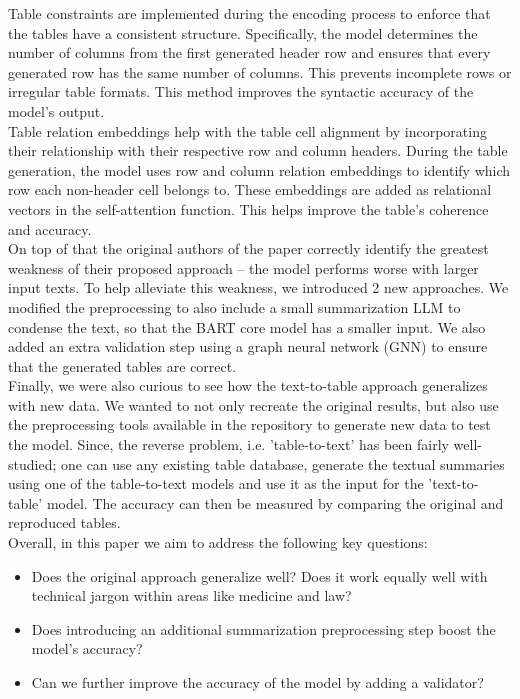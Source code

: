 \documentclass[12pt,a4paper]{article}
\begin{document}
Table constraints are implemented during the encoding process to enforce that the tables have a consistent structure. Specifically, the model determines the number of columns from the first generated header row and ensures that every generated row has the same number of columns. This prevents incomplete rows or irregular table formats. This method improves the syntactic accuracy of the model's output.
\ \\

Table relation embeddings help with the table cell alignment by incorporating their relationship with their respective row and column headers. During the table generation, the model uses row and column relation embeddings to identify which row each non-header cell belongs to. These embeddings are added as relational vectors in the self-attention function. This helps improve the table's coherence and accuracy. 
\ \\

On top of that the original authors of the paper correctly identify the greatest weakness of their proposed approach -- the model performs worse with larger input texts. To help alleviate this weakness, we introduced 2 new approaches. We modified the preprocessing to also include a small summarization LLM to condense the text, so that the BART core model has a smaller input. We also added an extra validation step using a graph neural network (GNN) to ensure that the generated tables are correct. 
\ \\

Finally, we were also curious to see how the text-to-table approach generalizes with new data. We wanted to not only recreate the original results, but also use the preprocessing tools available in the repository to generate new data to test the model. Since, the reverse problem, i.e. 'table-to-text' has been fairly well-studied; one can use any existing table database, generate the textual summaries using one of the table-to-text models and use it as the input for the 'text-to-table' model. The accuracy can then be measured by comparing the original and reproduced tables. 
\ \\

Overall, in this paper we aim to address the following key questions:
\begin{itemize}
    \item Does the original approach generalize well? Does it work equally well with technical jargon within areas like medicine and law? 
    \item Does introducing an additional summarization preprocessing step boost the model's accuracy?
    \item Can we further improve the accuracy of the model by adding a validator? 
\end{itemize}
\end{document}

